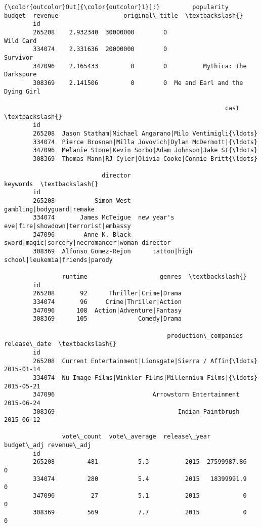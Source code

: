 \documentclass[11pt]{article}
\begin{document}
\begin{Verbatim}[commandchars=\\\{\}]
{\color{outcolor}Out[{\color{outcolor}1}]:}         popularity    budget  revenue                  original\_title  \textbackslash{}
        id                                                                      
        265208    2.932340  30000000        0                       Wild Card   
        334074    2.331636  20000000        0                        Survivor   
        347096    2.165433         0        0          Mythica: The Darkspore   
        308369    2.141506         0        0  Me and Earl and the Dying Girl   
        
                                                             cast  \textbackslash{}
        id                                                          
        265208  Jason Statham|Michael Angarano|Milo Ventimigli{\ldots}   
        334074  Pierce Brosnan|Milla Jovovich|Dylan McDermott|{\ldots}   
        347096  Melanie Stone|Kevin Sorbo|Adam Johnson|Jake St{\ldots}   
        308369  Thomas Mann|RJ Cyler|Olivia Cooke|Connie Britt{\ldots}   
        
                           director                                        keywords  \textbackslash{}
        id                                                                            
        265208           Simon West                       gambling|bodyguard|remake   
        334074       James McTeigue  new year's eve|fire|showdown|terrorist|embassy   
        347096        Anne K. Black  sword|magic|sorcery|necromancer|woman director   
        308369  Alfonso Gomez-Rejon      tattoo|high school|leukemia|friends|parody   
        
                runtime                    genres  \textbackslash{}
        id                                          
        265208       92      Thriller|Crime|Drama   
        334074       96     Crime|Thriller|Action   
        347096      108  Action|Adventure|Fantasy   
        308369      105              Comedy|Drama   
        
                                             production\_companies release\_date  \textbackslash{}
        id                                                                       
        265208  Current Entertainment|Lionsgate|Sierra / Affin{\ldots}   2015-01-14   
        334074  Nu Image Films|Winkler Films|Millennium Films|{\ldots}   2015-05-21   
        347096                           Arrowstorm Entertainment   2015-06-24   
        308369                                  Indian Paintbrush   2015-06-12   
        
                vote\_count  vote\_average  release\_year   budget\_adj revenue\_adj  
        id                                                                       
        265208         481           5.3          2015  27599987.86           0  
        334074         280           5.4          2015   18399991.9           0  
        347096          27           5.1          2015            0           0  
        308369         569           7.7          2015            0           0  
\end{Verbatim}
            
\end{document}
